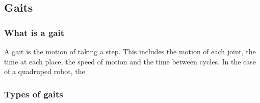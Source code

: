 \subsection{Gaits}
    \subsubsection{What is a gait}
    A gait is the motion of taking  a step. This includes the motion of each joint, the time at each place, the speed of motion and the time between cycles. In the case of a quadruped robot, the 
    
    \subsubsection{Types of gaits}
    




